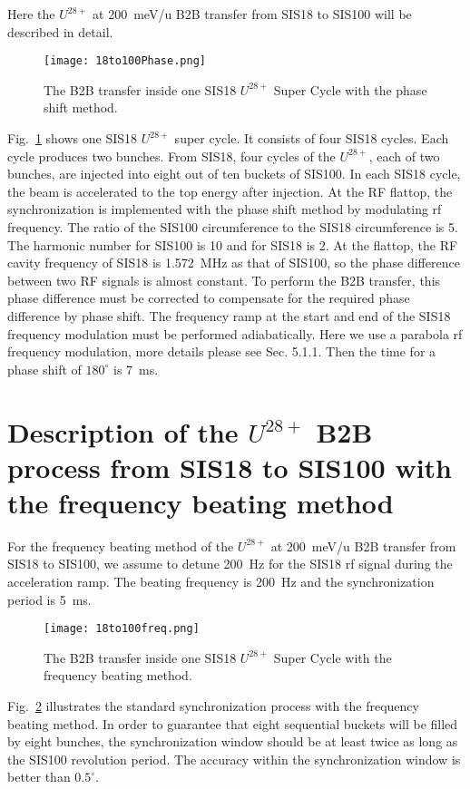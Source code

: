 Here the $U^{28+}$ at \SI{200}{meV/\atomicmassunit} B2B transfer from SIS18 to SIS100 will be described in detail. 
\begin{figure}[H]
   \centering   
   \texttt{[image: 18to100Phase.png]}
   \caption{The B2B transfer inside one SIS18 $U^{28+}$ Super Cycle with the phase shift method.}
   \label{18to100Phase}
\end{figure}
Fig.~\ref{18to100Phase} shows one SIS18 $U^{28+}$ super cycle. It consists of four SIS18 cycles. Each cycle produces two bunches. From SIS18, four cycles of the $U^{28+}$, each of two bunches, are injected into eight out of ten buckets of SIS100. In each SIS18 cycle, the beam is accelerated to the top energy after injection. At the RF flattop, the synchronization is implemented with the phase shift method by modulating rf frequency. 
The ratio of the SIS100 circumference to the SIS18 circumference is 5. The harmonic number for SIS100 is 10 and for SIS18 is 2. At the flattop, the RF cavity frequency of SIS18 is \SI{1.572}{MHz} as that of SIS100, so the phase difference between two RF signals is almost constant. To perform the B2B transfer, this phase difference must be corrected to compensate for the required phase difference by phase shift. The frequency ramp at the start and end of the SIS18 frequency modulation must be performed adiabatically. Here we use a parabola rf frequency modulation, more details please see Sec. 5.1.1.  Then the time for a phase shift of  $180^\circ$ is \SI{7}{\ms}.

\section{Description of the $U^{28+}$ B2B process from SIS18 to SIS100 with the frequency beating method}
For the frequency beating method of the $U^{28+}$ at \SI{200}{meV/\atomicmassunit} B2B transfer from SIS18 to SIS100, we assume to detune \SI{200}{Hz} for the SIS18 rf signal during the acceleration ramp. The beating frequency is \SI{200}{Hz} and the synchronization period is \SI{5}{\ms}.
\begin{figure}[H]
   \centering   
   \texttt{[image: 18to100freq.png]}
   \caption{The B2B transfer inside one SIS18 $U^{28+}$ Super Cycle with the frequency beating method.}
   \label{18to100freq}
\end{figure}
Fig.~\ref{18to100freq} illustrates the standard synchronization process with the frequency beating method. In order to guarantee that eight sequential buckets will be filled by eight bunches, the synchronization window should be at least twice as long as the SIS100 revolution period. The accuracy within the synchronization window is better than $0.5^\circ$. 

